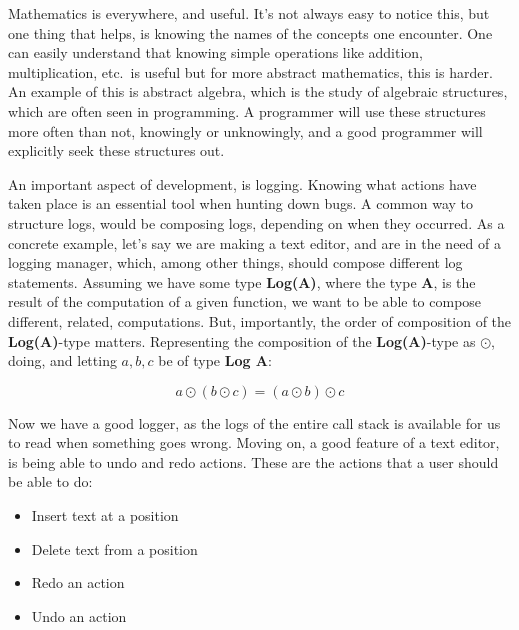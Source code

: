 Mathematics is everywhere, and useful. It's not always easy to notice this, but
one thing that helps, is knowing the names of the concepts one encounter. One
can easily understand that knowing simple operations like addition,
multiplication, etc.\ is useful but for more abstract mathematics, this is
harder. An example of this is abstract algebra, which is the study of algebraic
structures, which are often seen in programming. A programmer will use these
structures more often than not, knowingly or unknowingly, and a good programmer
will explicitly seek these structures out.

An important aspect of development, is logging. Knowing what actions have taken
place is an essential tool when hunting down bugs. A common way to structure
logs, would be composing logs, depending on when they occurred. As a concrete
example, let's say we are making a text editor, and are in the need of a logging
manager, which, among other things, should compose different log statements.
Assuming we have some type \textbf{Log(A)}, where the type \textbf{A}, is the
result of the computation of a given function, we want to be able to compose
different, related, computations. But, importantly, the order of composition
of the \textbf{Log(A)}-type matters. Representing the composition of the
\textbf{Log(A)}-type as $\odot$, doing, and letting $a, b, c$ be of type
\textbf{Log A}:

\begin{definition} \label{def:logComp}
  \begin{equation}
    a \odot \left ( b \odot c \right ) = \left ( a \odot b \right ) \odot c
  \end{equation}
\end{definition}


Now we have a good logger, as the logs of the entire call stack is available for
us to read when something goes wrong. Moving on, a good feature of a text
editor, is being able to undo and redo actions. These are the actions that a
user should be able to do:

\begin{itemize}
  \item Insert text at a position
  \item Delete text from a position
  \item Redo an action
  \item Undo an action
\end{itemize}

